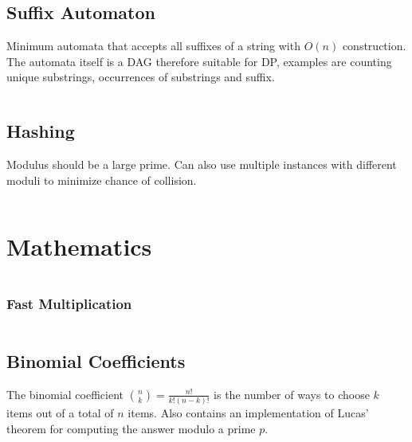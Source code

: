 \documentclass[9pt,a4paper,twocolumn,landscape,oneside]{amsart}
\newcommand{\code}[1]{\inputminted{cpp}{_code/#1}}
\newif\ifverbose
\begin{document}
    \subsection{Suffix Automaton}
        Minimum automata that accepts all suffixes of a string with $O(n)$
        construction. The automata itself is a DAG therefore suitable for DP,
        examples are counting unique substrings, occurrences of substrings and
        suffix.
        \code{strings/suffix_automaton.cpp}

    \subsection{Hashing}
        Modulus should be a large prime. Can also use multiple instances with
        different moduli to minimize chance of collision.
        \code{strings/hasher.cpp}

\section{Mathematics}
    \ifverbose
    \subsection{Fraction}
        A fraction (rational number) class. Note that numbers are stored in
        lowest common terms.
        \code{mathematics/fraction.cpp}
    \fi

    \ifverbose
    \subsection{Big Integer}
        \ifverbose
        A big integer class.
        \fi
        \code{mathematics/intx.cpp}

        \subsubsection{Fast Multiplication}
            \ifverbose
            Fast multiplication for the big integer using Fast Fourier Transform.
            \fi
            \code{mathematics/fastmul.cpp}
    \fi

    \subsection{Binomial Coefficients}
        The binomial coefficient $\binom{n}{k} = \frac{n!}{k!(n-k)!}$ is the
        number of ways to choose $k$ items out of a total of $n$ items. Also
        contains an implementation of Lucas' theorem for computing the answer
        modulo a prime $p$.
        \code{mathematics/nck.cpp}
\end{document}
